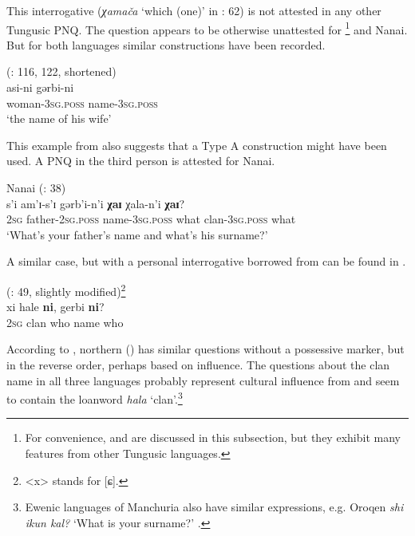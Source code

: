 \documentclass[output=paper,colorlinks,citecolor=brown]{langscibook}
\begin{document}
\begin{sloppypar}
\noindent This interrogative (\textit{χamača} ‘which (one)’ in \citealt{Sem1976}: 62) is not attested in any other Tungusic PNQ. The question appears to be otherwise unattested for \footnote{For convenience,  and  are discussed in this subsection, but they exhibit many features from other Tungusic languages.} and  Nanai. But for both languages similar constructions have been recorded.
\end{sloppypar}

\ea
    \label{example4.93}
     (\citealt{Sunik1958}: 116, 122, shortened)\\
    \gll asi-ni			gərbi-ni\\
    woman-3\textsc{sg.poss}	name-3\textsc{sg.poss}\\
    \glt ‘the name of his wife’
    \z

\noindent This example from  also suggests that a Type A construction might have been used. A PNQ in the third person is attested for  Nanai.

\ea
    \label{example4.94}
     Nanai (\citealt{Sem1976}: 38)\\
    \gll s’i		am’ɪ-s’ɪ		gərb’i-n’i		\textbf{χaɪ}	χala-n’i			\textbf{χaɪ}?\\
    2\textsc{sg}		father-2\textsc{sg.poss}	name-3\textsc{sg.poss}		what		clan-3\textsc{sg.poss}		what\\
    \glt ‘What’s your father’s name and what’s his surname?’
    \z

A similar case, but with a personal interrogative borrowed from  can be found in .

\ea
    \label{example4.95}
     (\citealt{Dong2016}: 49, slightly modified)\footnote{<x> stands for [ɕ].}\\
    \gll xi	hale		\textbf{ni},		gerbi	\textbf{ni}?\\
    2\textsc{sg}	clan		who		name	who\\
    \z

According to \citet[241]{Schmidt1928b}, northern  () has similar questions without a possessive marker, but in the reverse order, perhaps based on  influence. The questions about the clan name in all three languages probably represent cultural influence from  and seem to contain the loanword \textit{hala} ‘clan’.\footnote{Ewenic languages of Manchuria also have similar expressions, e.g. Oroqen \textit{shi ikun kal?} `What is your surname?' \citep[9]{Chaoke2014aH}.}
\end{document}
